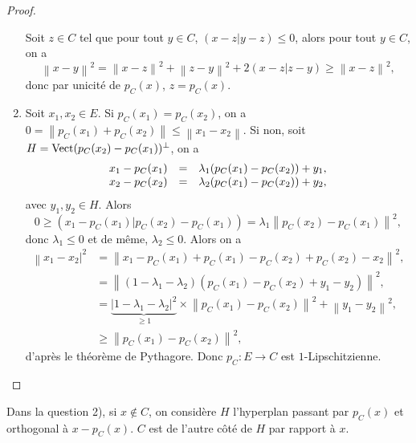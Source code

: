 \documentclass[12pt]{article}
\begin{document}
\begin{proof}
\begin{enumerate}
		Soit $z\in C$ tel que pour tout $y\in C$, $(x-z|y-z)\leqslant0$, alors pour tout $y\in C$, on a 
		\begin{equation}
			\left\lVert x-y\right\rVert^{2}=\left\lVert x-z\right\rVert^{2}+\left\lVert z-y\right\rVert^{2}+2(x-z|z-y)\geqslant\left\lVert x-z\right\rVert^{2},
		\end{equation}
		donc par unicité de $p_C(x)$, $z=p_C(x)$.

		\item Soit $x_1,x_2\in E$. Si $p_C(x_1)=p_C(x_2)$, on a $0=\left\lVert p_C(x_1)+p_C(x_2)\right\rVert\leqslant\left\lVert x_1-x_2\right\rVert$. Si non, soit $H=\operatorname{Vect}(p_C(x_2)-p_C(x_1))^{\perp}$, on a 
		\begin{equation}
			\begin{array}[]{rcl}
				x_1-p_C(x_1)&=&\lambda_1(p_C(x_1)-p_C(x_2))+y_1,\\
				x_2-p_C(x_2)&=&\lambda_2(p_C(x_1)-p_C(x_2))+y_2,\\
			\end{array}
		\end{equation}
		avec $y_1,y_2\in H$. Alors 
		\begin{equation}
			0\geqslant(x_1-p_C(x_1)|p_C(x_2)-p_C(x_1))=\lambda_1\left\lVert p_C(x_2)-p_C(x_1)\right\rVert^{2},
		\end{equation}
		donc $\lambda_1\leqslant0$ et de même, $\lambda_2\leqslant0$.
		Alors on a
		\begin{align}
			\left\lVert x_1-x_2\right\rvert^{2}
			&=\left\lVert x_1-p_C(x_1)+p_C(x_1)-p_C(x_2)+p_C(x_2)-x_2\right\rVert^{2},\\
			&=\left\lVert (1-\lambda_1-\lambda_2)(p_C(x_1)-p_C(x_2)+y_1-y_2)\right\rVert^{2},\\
			&=\underbrace{\left\lvert1-\lambda_1-\lambda_2\right\rvert^{2}}_{\geqslant1}\times\left\lVert p_C(x_1)-p_C(x_2)\right\rVert^{2}+\left\lVert y_1-y_2\right\rVert^{2},\\
			&\geqslant\left\lVert p_C(x_1)-p_C(x_2)\right\rVert^{2},
		\end{align}
		d'après le théorème de Pythagore. Donc $p_C\colon E\to C$ est $1$-Lipschitzienne.
	\end{enumerate}
\end{proof}

\begin{remark}
	Dans la question 2), si $x\not\in C$, on considère $H$ l'hyperplan passant par $p_C(x)$ et orthogonal à $x-p_C(x)$. $C$ est de l'autre côté de $H$ par rapport à $x$.
\end{remark}
\end{document}

